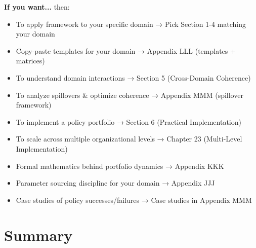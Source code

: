 \begin{tcolorbox}[colback=yellow!5!white, colframe=yellow!75!black, title=Where to Go Next]

\textbf{If you want...} then:
\begin{itemize}[nosep]
\item To apply framework to your specific domain → Pick Section 1-4 matching your domain
\item Copy-paste templates for your domain → Appendix LLL (templates + matrices)
\item To understand domain interactions → Section 5 (Cross-Domain Coherence)
\item To analyze spillovers & optimize coherence → Appendix MMM (spillover framework)
\item To implement a policy portfolio → Section 6 (Practical Implementation)
\item To scale across multiple organizational levels → Chapter 23 (Multi-Level Implementation)
\item Formal mathematics behind portfolio dynamics → Appendix KKK
\item Parameter sourcing discipline for your domain → Appendix JJJ
\item Case studies of policy successes/failures → Case studies in Appendix MMM
\end{itemize}

\end{tcolorbox}

\section{Summary}
\label{sec:ch22-summary}

